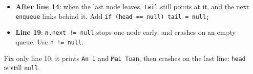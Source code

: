 \documentclass[aspectratio=169]{beamer}
\newcommand{\code}[1]{\texttt{#1}}
\begin{document}
\begin{frame}
\begin{columns}[T,onlytextwidth]
\begin{onlyenv}
\begin{itemize}[itemsep=0.1em, topsep=0.1em, leftmargin=1em]
            \code{else \{ tail.next = n; tail = n; \}}
      \item \textbf{After line 14}: when the last node leaves, \code{tail} still
            points at it, and the next \code{enqueue} links behind it. Add
            \code{if (head == null) tail = null;}
      \item \textbf{Line 19}: \code{n.next != null} stops one node early, and
            crashes on an empty queue. Use \code{n != null}.
    \end{itemize}
    {\footnotesize Fix only line 10: it prints \code{An 1} and \code{Mai Tuan},
    then crashes on the last line: \code{head} is still \code{null}.}
    \end{onlyenv}
  \end{columns}
\end{frame}
\end{document}
